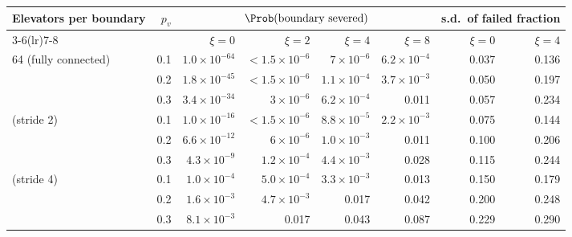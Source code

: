\begin{tabular}{@{}lrrrrrrr@{}}
\toprule
Elevators per boundary & $p_v$ & \multicolumn{4}{c}{$\Prob(\text{boundary severed})$} & \multicolumn{2}{c}{s.d.\ of failed fraction} \\
\cmidrule(lr){3-6}\cmidrule(lr){7-8}
 & & $\xi=0$ & $\xi=2$ & $\xi=4$ & $\xi=8$ & $\xi=0$ & $\xi=4$ \\
\midrule
64 (fully connected) & 0.1 & $1.0{\times}10^{-64}$ & $<1.5{\times}10^{-6}$ & $7{\times}10^{-6}$ & $6.2{\times}10^{-4}$ & 0.037 & 0.136 \\
 & 0.2 & $1.8{\times}10^{-45}$ & $<1.5{\times}10^{-6}$ & $1.1{\times}10^{-4}$ & $3.7{\times}10^{-3}$ & 0.050 & 0.197 \\
 & 0.3 & $3.4{\times}10^{-34}$ & $3{\times}10^{-6}$ & $6.2{\times}10^{-4}$ & 0.011 & 0.057 & 0.234 \\
\addlinespace
16 (stride 2) & 0.1 & $1.0{\times}10^{-16}$ & $<1.5{\times}10^{-6}$ & $8.8{\times}10^{-5}$ & $2.2{\times}10^{-3}$ & 0.075 & 0.144 \\
 & 0.2 & $6.6{\times}10^{-12}$ & $6{\times}10^{-6}$ & $1.0{\times}10^{-3}$ & 0.011 & 0.100 & 0.206 \\
 & 0.3 & $4.3{\times}10^{-9}$ & $1.2{\times}10^{-4}$ & $4.4{\times}10^{-3}$ & 0.028 & 0.115 & 0.244 \\
\addlinespace
4 (stride 4) & 0.1 & $1.0{\times}10^{-4}$ & $5.0{\times}10^{-4}$ & $3.3{\times}10^{-3}$ & 0.013 & 0.150 & 0.179 \\
 & 0.2 & $1.6{\times}10^{-3}$ & $4.7{\times}10^{-3}$ & 0.017 & 0.042 & 0.200 & 0.248 \\
 & 0.3 & $8.1{\times}10^{-3}$ & 0.017 & 0.043 & 0.087 & 0.229 & 0.290 \\
\bottomrule
\end{tabular}
